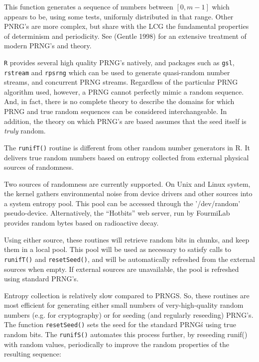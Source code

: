 \documentclass[11pt]{article}
\begin{document}
This function  generates a sequence of numbers between $[0,m-1]$ which appears to be, using some tests, uniformly distributed in that range.  Other PNRG's are more complex, but share with the LCG the  fundamental properties of determinism and periodicity.  See (Gentle 1998) for an extensive treatment of modern PRNG's and theory.

\texttt{R} provides several high quality PRNG's natively, and packages such as  
\texttt{gsl}, \texttt{rstream} and \texttt{rpsrng} which  can be used to generate
quasi-random number streams, and concurrent  PRNG streams.
Regardless of the particular PRNG algorithm used, however, a PRNG cannot
perfectly mimic a random sequence. And, in fact, there is no complete
theory to describe the domains for which PRNG and true random sequences 
can be considered interchangeable.  In addition, the theory
on which PRNG's are based assumes that the seed itself is \emph{truly} random.

The \texttt{runifT()} routine is different from other random number generators in R. 
It delivers true random numbers based on
entropy collected from external physical sources of randomness.

Two sources of randomness are currently supported. On Unix and Linux system, the kernel gathers environmental noise from 
device drivers and other sources into a system entropy pool.
This pool can be accessed through the '/dev/random' pseudo-device.
Alternatively, the ``Hotbits'' web server, run by FourmiLab provides random bytes based on radioactive decay.

Using either source, these routines will retrieve random bits in chunks,
 and keep them in a local pool. This pool will be used as necessary to 
 satisfy calls to \texttt{runifT()} and \texttt{resetSeed()},
  and will be automatically refreshed from the external sources when empty. 
  If external sources are unavailable, the pool is refreshed using standard PRNG's.

Entropy collection is relatively slow compared to PRNGS. So, these routines
are most efficient for generating either small numbers of very-high-quality random
numbers (e.g. for cryptography) or for seeding (and regularly reseeding) PRNG's. 
The function \texttt{resetSeed()} sets the seed for the standard PRNG\'s using
true random bits.  The \texttt{runifS()} automates this process further, by  reseeding 
runif() with random values, periodically to improve the random properties of the
 resulting sequence:
\end{document}
